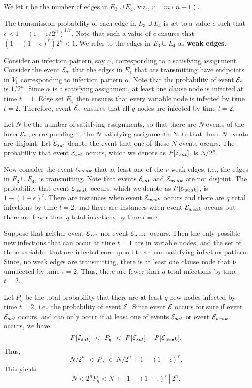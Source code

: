 We let $r$  be the number of edges in $E_3 \cup E_4$, viz., $r = m(n-1)$.

The transmission probability of each edge in $E_3 \cup E_4$ 
is set to a value $\epsilon$ such that $\epsilon < 1 - (1 - 1/{2^n})^{1/r}$.
Note that such a value of $\epsilon$ ensures that $(1 - (1 -  \epsilon)^r) 2^n < 1$.
We refer to the edges in $E_3 \cup E_4$ as {\bf weak edges}.

Consider an infection pattern, say $\alpha$,
corresponding to a satisfying assignment.
Consider the event ${\cal E}_{\alpha}$ that the edges in $E_1$ that are transmitting 
have endpoints in $V_1$ corresponding to infection pattern $\alpha$.
Note that the probability of event ${\cal E}_{\alpha}$ is $1/{2^n}$.
Since $\alpha$ is a satisfying assignment,
at least one clause node is infected at time $t = 1$.
Edge set $E_5$ then ensures that every variable node is infected by time $t=2$.
Therefore, event ${\cal E}_{\alpha}$ ensures
that all $q$ nodes are infected by time $t = 2$.  

Let $N$ be the number of satisfying assignments, 
so that there are $N$ events of the form ${\cal E}_{\alpha}$,
corresponding to the $N$ satisfying assignments.
Note that these $N$ events are disjoint.
Let ${\cal E}_{sat}$ denote the event that one of these $N$ events occurs.
The probability that event ${\cal E}_{sat}$ occurs,
which we denote as  $P[{\cal E}_{sat}]$, is $N/2^n$.

Now consider the event ${\cal E}_{weak}$ that at least one of the $r$ weak edges,
i.e., the edges in $E_3 \cup E_4$, is transmitting.
Note that events ${\cal E}_{sat}$ and ${\cal E}_{weak}$ are not disjoint.
The probability that event ${\cal E}_{weak}$ occurs,
which we denote as  $P[{\cal E}_{weak}]$, is $1 -(1 -  \epsilon)^r$.
There are instances when event ${\cal E}_{weak}$ occurs 
and there are $q$ total infections by time $t=2$;
and there are instances when event ${\cal E}_{weak}$ occurs 
but there are fewer than $q$ total infections by time $t=2$.

Suppose that neither event ${\cal E}_{sat}$ nor event ${\cal E}_{weak}$ occurs.
Then the only possible new infections that can occur at time $t=1$ are in
variable nodes, and the set of these variables that are infected correspond 
to an non-satisfying infection pattern.
Since, no weak edges are transmitting, 
there is at least one clause node that is uninfected by time $t=2$.
Thus, there are fewer than $q$ total infections by time $t=2$.

Let $P_q$ be the
total probability that there are at least $q$ new nodes infected by
time $t = 2$, i.e., the probability of event ${\cal E}$.  
Since event ${\cal E}$ occurs for sure if event ${\cal E}_{sat}$ occurs,
and can only occur if at least one of events ${\cal E}_{sat}$ 
or event ${\cal E}_{weak}$ occurs, we have
$$P[{\cal E}_{sat}]  ~<~ P_q  ~<~  P[{\cal E}_{sat}]  + P[{\cal E}_{weak}].$$
Thus,
$$N/2^n ~<~ P_q  ~<~  N/2^n  + 1 - (1 -  \epsilon)^r.$$
This yields
$$ N < 2^n  P_q   <  N  + [1 - (1 -  \epsilon)^r] 2^n.$$

